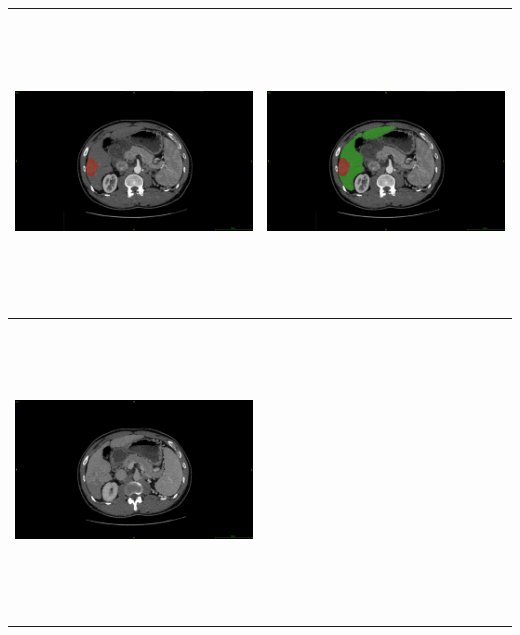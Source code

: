 \documentclass[]{article}
\begin{document}
\begin{longtable}[c]{@{}ll@{}}
\toprule
\includegraphics[width=3.10417in,height=3.09722in]{./images/media/image2.png}
&
\includegraphics[width=3.10417in,height=3.09722in]{./images/media/image19.png}\tabularnewline
\midrule
\endhead
\includegraphics[width=3.10417in,height=3.09722in]{./images/media/image8.png}

\end{longtable}
\end{document}
